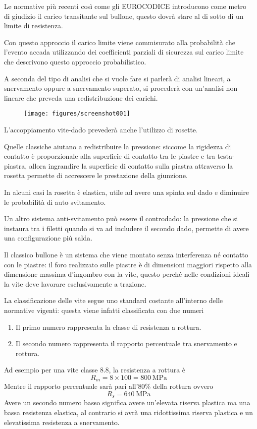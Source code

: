 \documentclass[a4paper, 15pt]{article}
\begin{document}
\begin{adjustwidth}{2in}{}
	 Le normative più recenti così come gli EUROCODICE introducono come metro di giudizio il carico  transitante sul bullone, questo dovrà stare al di sotto di un limite di resistenza. 
	 
	 Con questo approccio il carico limite viene commisurato alla probabilità che l'evento accada utilizzando dei coefficienti parziali di sicurezza sul carico limite che descrivono questo approccio probabilistico. \newline 
	 
	 A seconda del tipo di analisi che si vuole fare si parlerà di analisi  lineari, a snervamento oppure a snervamento superato, si procederà con un'analisi non lineare che preveda una redistribuzione dei carichi. 
	 \begin{figure}[H]
	 	\centering
	 	\texttt{[image: figures/screenshot001]}
	 	\label{fig:screenshot001}
	 \end{figure}
	 L'accoppiamento vite-dado prevederà anche l'utilizzo di rosette. 
	 
	 Quelle classiche aiutano a redistribuire la pressione: siccome la rigidezza di contatto è proporzionale alla superficie di contatto tra le piastre e tra testa-piastra, allora ingrandire la superficie di contatto  sulla piastra attraverso la rosetta permette di accrescere le prestazione della giunzione. 
	 
	 In alcuni casi la rosetta è elastica, utile ad avere una spinta sul dado e diminuire le probabilità di auto svitamento. 
	 
	 Un altro sistema anti-svitamento può essere il controdado: la pressione che si instaura tra i filetti quando si va ad includere il secondo dado, permette di avere una configurazione più salda. \newline 
	 
	 Il classico bullone è un sistema che viene montato  senza interferenza né contatto con le piastre: il foro realizzato sulle piastre è di dimensioni maggiori rispetto alla  dimensione massima d'ingombro con la vite, questo perché nelle condizioni ideali la vite deve lavorare esclusivamente a trazione. \newline 
	 
	 La classificazione delle vite segue uno standard costante  all'interno delle normative vigenti: questa viene infatti classificata con due numeri
	 \begin{enumerate}
	 	\item Il primo numero rappresenta la classe di resistenza a rottura. 
	 	\item Il secondo numero rappresenta il rapporto percentuale tra snervamento e rottura. 
	 \end{enumerate} 
	 Ad esempio per una vite classe 8.8, la resistenza a rottura è 
	 \[R_m = 8\times100 = \SI{800}{\mega\pascal}\]
	 Mentre il rapporto percentuale sarà pari all'80\% della rottura ovvero 
	 \[R_s = \SI{640}{\mega\pascal}\]
	Avere un secondo numero basso significa avere un'elevata riserva plastica ma una bassa resistenza elastica, al contrario si avrà una ridottissima riserva plastica e un elevatissima resistenza a snervamento.
	

\end{adjustwidth}
\end{document}
